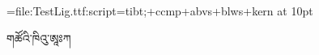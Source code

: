 

\font\testa=file:TestLig.ttf:script=tibt;+ccmp+abvs+blws+kern at 10pt

\testa གཚོའི་ཁིའུ་ཨཱཿཀ



\bye

